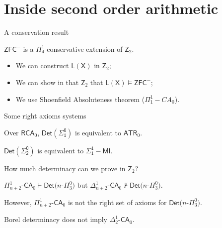 \documentclass{beamer} %
\begin{document}

\section{Inside second order arithmetic}

\begin{frame}{A conservation result}
    \begin{theorem}
        $\mathsf{ZFC}^-$ is a $\Pi^1_4$ conservative extension of $\mathsf{Z}_2$.    
    \end{theorem}
    
    \begin{itemize}
        \item<2-> We can construct $\mathsf{L(X)}$ in $\mathsf{Z}_2$;
        \item<3-> We can show in that $\mathsf{Z}_2$ that $\mathsf{L(X)} \models \mathsf{ZFC}^-$;
        \item<4-> We use Shoenfield Absoluteness theorem ($\mathsf{\Pi_1^1}-CA_0$).
    \end{itemize}

\end{frame}


\begin{frame}{Some right axioms systems}
    \begin{theorem}
        Over $\mathsf{RCA}_0$, $\mathsf{Det(\Sigma_1^0)}$ is equivalent to $\mathsf{ATR}_0$. 
    \end{theorem}

    \begin{theorem}[Tanaka]
        $\mathsf{Det(\Sigma_2^0)}$ is equivalent to $\mathsf{\Sigma_1^1-MI}$.
    \end{theorem}
\end{frame}


\begin{frame}{How much determinacy can we prove in $\mathsf{Z}_2$?} 
    \begin{theorem}
        $\Pi^1_{n+2}$-$\mathsf{CA}_0 \vdash \mathsf{Det}(n$-$\Pi^0_3)$ but
        $\Delta^1_{n+2}$-$\mathsf{CA}_0 \not\vdash \mathsf{Det}(n$-$\Pi^0_3)$.
    \end{theorem}
    However, $\Pi^1_{n+2}$-$\mathsf{CA}_0$ is not the right set of axioms for 
    $\mathsf{Det}(n$-$\Pi^0_3)$.

    \begin{theorem}
        Borel determinacy does not imply $\Delta^1_2$-$\mathsf{CA}_0$.
    \end{theorem}
\end{frame}
\end{document}
